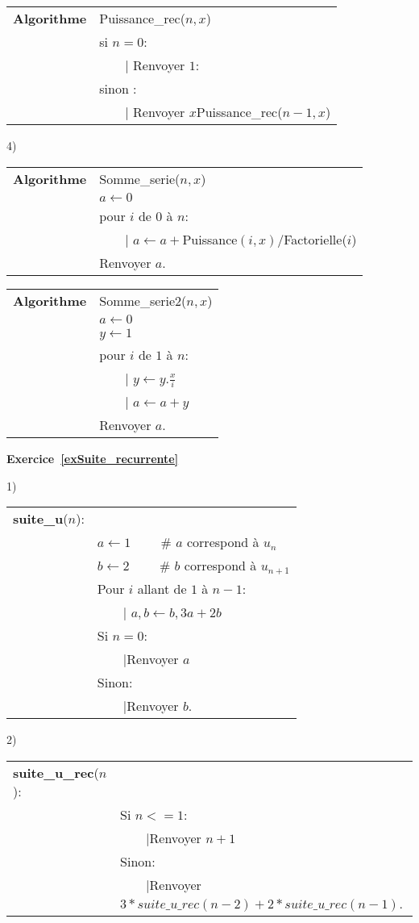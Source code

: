\documentclass[10pt,a4paper]{article}
\begin{document}
\begin{tabular}{ll}
\textbf{Algorithme} &Puissance\_rec($n,x$) \\
&si $n=0$:\\
& \ \ \ {\ \rm |} Renvoyer $1$:\\
& sinon :\\
& \ \ \ {\ \rm |} Renvoyer $x$Puissance\_rec($n-1,x$)
\end{tabular}


4)

 \begin{tabular}{ll}
\textbf{Algorithme} &Somme\_serie($n,x$) \\
& $a\leftarrow 0$ \\
& pour $i$ de $0$ à $n$:\\
& \ \ \ {\ \rm |}  $a\leftarrow a+$Puissance$(i,x)$/Factorielle($i$)\\
& Renvoyer $a$.
\end{tabular}

\begin{tabular}{ll}
\textbf{Algorithme} &Somme\_serie2($n,x$) \\
& $a\leftarrow 0$ \\
& $y\leftarrow 1$\\
& pour $i$ de $1$ à $n$:\\
& \ \ \ {\ \rm |} $y\leftarrow y. \frac{x}{i}$\\
& \ \ \ {\ \rm |}  $a\leftarrow a+y$\\
& Renvoyer $a$.
\end{tabular}


\textbf{Exercice~\ref{exSuite_recurrente}}

1) 

 \begin{tabular}{ll}
\textbf{suite\_u}($n$):\\
& $a\leftarrow 1$ \ \ \ \ \# $a$ correspond à $u_n$ \\ 
& $b\leftarrow 2$ \ \ \ \ \# $b$ correspond à $u_{n+1}$ \\
& Pour $i$ allant  de $1$ à $n-1$: \\
&\ \ \ {\ \rm |} $a,b\leftarrow b,3a+2b$\\
& Si $n=0$:\\
&\ \ \ {\ \rm |}Renvoyer $a$\\
& Sinon: \\
&\ \ \ {\ \rm |}Renvoyer $b$.
\end{tabular}

2) 

 \begin{tabular}{ll}
\textbf{suite\_u\_rec}($n$):\\

& Si $n<=1$:\\
&\ \ \ {\ \rm |}Renvoyer $n+1$\\
& Sinon: \\
&\ \ \ {\ \rm |}Renvoyer $3*suite\_u\_rec(n-2)+2*suite\_u\_rec(n-1)$.
\end{tabular}
\end{document}
